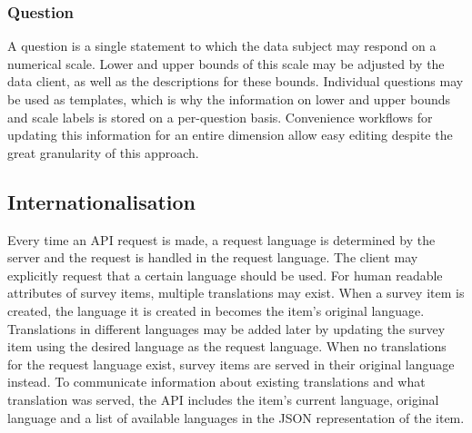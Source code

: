\documentclass[a4paper,11pt]{article}
\begin{document}
                \subsubsection{Question}
                    A question is a single statement to which the data subject may respond
                    on a numerical scale. Lower and upper bounds of this scale
                    may be adjusted by the data client, as well as the descriptions
                    for these bounds. Individual questions may be used as templates,
                    which is why the information on lower and upper bounds and scale
                    labels is stored on a per-question basis. Convenience workflows
                    for updating this information for an entire dimension allow
                    easy editing despite the great granularity of this approach.

            \subsection{Internationalisation}
                Every time an API request is made,
                a request language is determined by the server and the request is
                handled in the request language. The client may explicitly request
                that a certain language should be used.
                For human readable attributes of survey items, multiple translations
                may exist. When a survey item is created, the language it is created
                in becomes the item's original language. Translations in different
                languages may be added later by updating the survey item using 
                the desired language as the request language. 
                When no translations for the request language exist, survey items 
                are served in their original language instead.
                To communicate information about existing translations and
                what translation was served, the API includes the item's
                current language, original language and a list of available languages
                in the JSON representation of the item.
\end{document}
